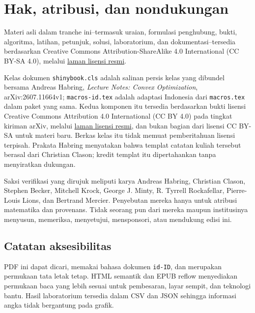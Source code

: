 \documentclass[indonesian]{shinybook}
\begin{document}
\backmatter
\chapter*{Hak, atribusi, dan nondukungan}
Materi asli dalam tranche ini--termasuk uraian, formulasi penghubung, bukti,
algoritma, latihan, petunjuk, solusi, laboratorium, dan dokumentasi--tersedia
berdasarkan Creative Commons Attribution-ShareAlike 4.0 International
(CC BY-SA 4.0), melalui
\href{https://creativecommons.org/licenses/by-sa/4.0/}{laman lisensi resmi}.

Kelas dokumen \texttt{shinybook.cls} adalah salinan persis kelas yang
dibundel bersama Andreas Habring, \emph{Lecture Notes: Convex Optimization},
arXiv:2607.11664v1; \texttt{macros-id.tex} adalah adaptasi Indonesia dari
\texttt{macros.tex} dalam paket yang sama. Kedua komponen itu tersedia
berdasarkan bukti lisensi Creative Commons Attribution 4.0 International
(CC BY 4.0) pada tingkat kiriman arXiv, melalui
\href{https://creativecommons.org/licenses/by/4.0/}{laman lisensi resmi}, dan
bukan bagian dari lisensi CC BY-SA untuk materi baru. Berkas kelas itu tidak
memuat pemberitahuan lisensi terpisah. Prakata Habring menyatakan bahwa templat
catatan kuliah tersebut berasal dari Christian Clason; kredit templat itu
dipertahankan tanpa menyiratkan dukungan.

Saksi verifikasi yang dirujuk meliputi karya Andreas Habring, Christian
Clason, Stephen Becker, Mitchell Krock, George J. Minty, R. Tyrrell
Rockafellar, Pierre-Louis Lions, dan Bertrand Mercier. Penyebutan mereka hanya
untuk atribusi matematika dan provenans. Tidak seorang pun dari mereka maupun
institusinya menyusun, memeriksa, menyetujui, mensponsori, atau mendukung edisi
ini.

\section*{Catatan aksesibilitas}
PDF ini dapat dicari, memakai bahasa dokumen \texttt{id-ID}, dan merupakan
permukaan tata letak tetap. HTML semantik dan EPUB reflow menyediakan
permukaan baca yang lebih sesuai untuk pembesaran, layar sempit, dan teknologi
bantu. Hasil laboratorium tersedia dalam CSV dan JSON sehingga informasi
angka tidak bergantung pada grafik.
\end{document}
